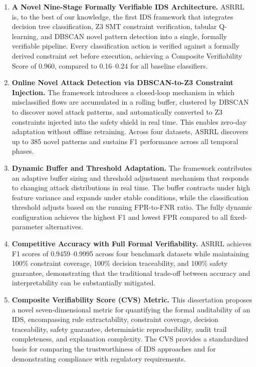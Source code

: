 \documentclass[12pt, letterpaper, oneside]{report}
\newcommand{\ASRRL}{\textsc{ASRRL}}
\begin{document}
\begin{enumerate}
    \item \textbf{A Novel Nine-Stage Formally Verifiable IDS Architecture.} \ASRRL{} is, to the best of our knowledge, the first IDS framework that integrates decision tree classification, Z3 SMT constraint verification, tabular Q-learning, and DBSCAN novel pattern detection into a single, formally verifiable pipeline. Every classification action is verified against a formally derived constraint set before execution, achieving a Composite Verifiability Score of 0.960, compared to 0.16--0.24 for all baseline classifiers.

    \item \textbf{Online Novel Attack Detection via DBSCAN-to-Z3 Constraint Injection.} The framework introduces a closed-loop mechanism in which misclassified flows are accumulated in a rolling buffer, clustered by DBSCAN to discover novel attack patterns, and automatically converted to Z3 constraints injected into the safety shield in real time. This enables zero-day adaptation without offline retraining. Across four datasets, \ASRRL{} discovers up to 385 novel patterns and sustains F1 performance across all temporal phases.

    \item \textbf{Dynamic Buffer and Threshold Adaptation.} The framework contributes an adaptive buffer sizing and threshold adjustment mechanism that responds to changing attack distributions in real time. The buffer contracts under high feature variance and expands under stable conditions, while the classification threshold adjusts based on the running FPR-to-FNR ratio. The fully dynamic configuration achieves the highest F1 and lowest FPR compared to all fixed-parameter alternatives.

    \item \textbf{Competitive Accuracy with Full Formal Verifiability.} \ASRRL{} achieves F1 scores of 0.9459--0.9995 across four benchmark datasets while maintaining 100\% constraint coverage, 100\% decision traceability, and 100\% safety guarantee, demonstrating that the traditional trade-off between accuracy and interpretability can be substantially mitigated.

    \item \textbf{Composite Verifiability Score (CVS) Metric.} This dissertation proposes a novel seven-dimensional metric for quantifying the formal auditability of an IDS, encompassing rule extractability, constraint coverage, decision traceability, safety guarantee, deterministic reproducibility, audit trail completeness, and explanation complexity. The CVS provides a standardized basis for comparing the trustworthiness of IDS approaches and for demonstrating compliance with regulatory requirements.
\end{enumerate}
\end{document}
